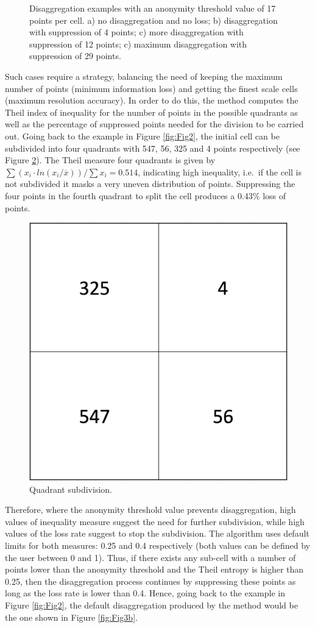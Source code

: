 \begin{figure}[ht!]
\begin{minipage}[b]{0.22\linewidth}
    \subcaption{}
    \label{fig:Fig3d}
  \end{minipage}
  \caption{Disaggregation examples with an anonymity threshold value of 17 points per cell. a) no disaggregation and no loss; b) disaggregation with suppression of  4 points; c) more disaggregation with suppression of 12 points; c) maximum disaggregation with suppression of 29 points.}
  \label{fig:Fig3}
\end{figure}

Such cases require a strategy, balancing the need of keeping the maximum number of points (minimum information loss) and getting the finest scale cells (maximum resolution accuracy). In order to do this, the method computes the Theil index of inequality  \citep{Theil1972} for the number of points in the possible quadrants as well as the percentage of suppressed points needed for the division to be carried out. Going back to the example in Figure \ref{fig:Fig2}, the initial cell can be subdivided into four quadrants with 547, 56, 325 and 4 points respectively (see Figure \ref{fig:Fig4}). The Theil measure four quadrants is given by $\sum\left(x_{i} \cdot ln\left(x_{i}/\overline{x}\right)\right) / \sum x_{i} = 0.514$, indicating high inequality, i.e.\ if the cell is not subdivided it masks a very uneven distribution of points. Suppressing the four points in the fourth quadrant to split the cell produces a 0.43\% loss of points.
\begin{figure}[ht!]
\centering
\includegraphics[width=0.18\linewidth]{images/Fig4.png}
\caption{\label{fig:Fig4} Quadrant subdivision.}
\end{figure}

Therefore, where the anonymity threshold value prevents disaggregation, high values of inequality measure suggest the need for further subdivision, while high values of the loss rate suggest to stop the subdivision. The algorithm uses default limits for both measures: 0.25 and 0.4 respectively (both values can be defined by the user between 0 and 1). Thus, if there exists any sub-cell with a number of points lower than the anonymity threshold and the Theil entropy is higher than 0.25, then the disaggregation process continues by suppressing these points as long as the loss rate is lower than 0.4. Hence, going back to the example in Figure \ref{fig:Fig2}, the default disaggregation produced by the method would be the one shown in Figure \ref{fig:Fig3b}.

